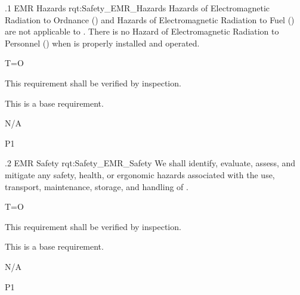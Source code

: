 \ONERQMTV
{\RqtNumberBase.1}
{EMR Hazards}
{rqt:Safety_EMR_Hazards}
{Hazards of Electromagnetic Radiation to Ordnance (\HERO) and Hazards of Electromagnetic Radiation to Fuel (\HERF) are not applicable to \ThisSys. There is no Hazard of Electromagnetic Radiation to Personnel (\HERP) when \ThisSys is properly installed and operated.}
{
	\item T=O
}
{This requirement shall be verified by inspection.}
{
\item [N/A] This is a base requirement.
}
{
	\item N/A
}
{P1}

\ONERQMTV
{\RqtNumberBase.2}
{EMR Safety}
{rqt:Safety_EMR_Safety}
{We shall identify, evaluate, assess, and mitigate any safety, health, or ergonomic hazards associated with the use, transport, maintenance, storage, and handling of \ThisSys.}
{
	\item T=O
}
{This requirement shall be verified by inspection.}
{
\item [N/A] This is a base requirement.
}
{
	\item N/A
}
{P1}


